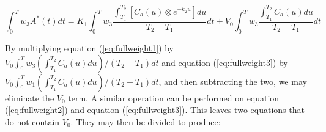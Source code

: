 \begin{equation}
\int_{0}^{T} w_{3}A^{*}(t)dt = K_{1} \int_{0}^{T} w_{3}
\frac{\int_{T_1}^{T_2} \left[ C_{a}(u) \otimes e^{-k_{2}u} \right]
du}{T_2 - T_1} dt + V_{0} \int_{0}^{T}w_{3} \frac{\int_{T_1}^{T_2}
C_{a}(u) du}{T_2 - T_1} dt \label{eq:fullweight3}
\end{equation}

By multiplying equation (\ref{eq:fullweight1}) by $V_{0}
\int_{0}^{T} w_{3} {(\int_{T_1}^{T_2}C_{a}(u)du)}/{(T_2 - T_1)} dt$
and equation (\ref{eq:fullweight3}) by $V_{0} \int_{0}^{T} w_{1}
{(\int_{T_1}^{T_2}C_{a}(u)du)}/{(T_2 - T_1)} dt$, and then
subtracting the two, we may eliminate the $V_{0}$ term.  A similar
operation can be performed on equation (\ref{eq:fullweight2}) and
equation (\ref{eq:fullweight3}).  This leaves two equations that do
not contain $V_{0}$.  They may then be divided to produce:

